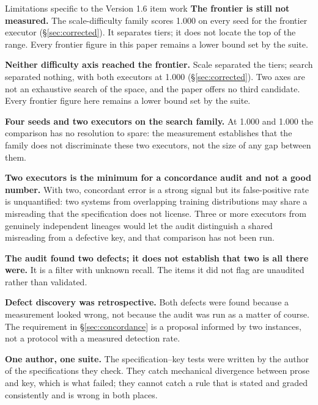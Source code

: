 \documentclass[11pt]{article}
\theoremstyle{definition}
\begin{document}
\begin{cautionbox}{Limitations specific to the Version 1.6 item work}
\textbf{The frontier is still not measured.} The scale-difficulty family scores 1.000 on every seed for the frontier executor (\S\ref{sec:corrected}). It separates tiers; it does not locate the top of the range. Every frontier figure in this paper remains a lower bound set by the suite.

\textbf{Neither difficulty axis reached the frontier.} Scale separated the tiers; search separated nothing, with both executors at 1.000 (\S\ref{sec:corrected}). Two axes are not an exhaustive search of the space, and the paper offers no third candidate. Every frontier figure here remains a lower bound set by the suite.

\textbf{Four seeds and two executors on the search family.} At 1.000 and 1.000 the comparison has no resolution to spare: the measurement establishes that the family does not discriminate these two executors, not the size of any gap between them.

\textbf{Two executors is the minimum for a concordance audit and not a good number.} With two, concordant error is a strong signal but its false-positive rate is unquantified: two systems from overlapping training distributions may share a misreading that the specification does not license. Three or more executors from genuinely independent lineages would let the audit distinguish a shared misreading from a defective key, and that comparison has not been run.

\textbf{The audit found two defects; it does not establish that two is all there were.} It is a filter with unknown recall. The items it did not flag are unaudited rather than validated.

\textbf{Defect discovery was retrospective.} Both defects were found because a measurement looked wrong, not because the audit was run as a matter of course. The requirement in \S\ref{sec:concordance} is a proposal informed by two instances, not a protocol with a measured detection rate.

\textbf{One author, one suite.} The specification--key tests were written by the author of the specifications they check. They catch mechanical divergence between prose and key, which is what failed; they cannot catch a rule that is stated and graded consistently and is wrong in both places.
\end{cautionbox}
\end{document}
